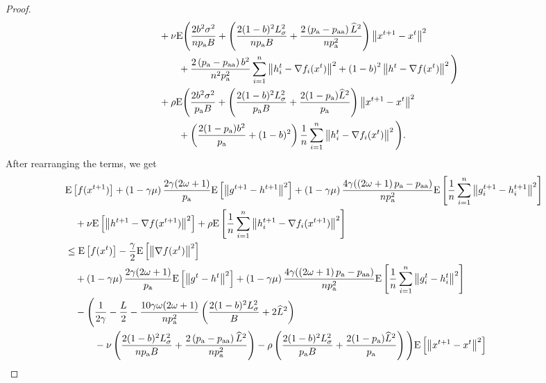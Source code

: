 \documentclass{article}
\newcommand*{\probavailable}{\ensuremath{p_{\textnormal{a}}}}
\newcommand*{\probpairaa}{\ensuremath{p_{\textnormal{aa}}}}
\begin{document}
\begin{proof}
\begin{align*}
        &\quad  + \nu {\rm E}\Bigg(\frac{2 b^2 \sigma^2}{n \probavailable B} + \left(\frac{2 (1 - b)^2 L_{\sigma}^2}{n \probavailable B} + \frac{2\left(\probavailable - \probpairaa\right) \widehat{L}^2}{n \probavailable^2} \right) \norm{x^{t+1} - x^{t}}^2\\
        &\qquad\quad + \frac{2 \left(\probavailable - \probpairaa\right) b^2}{n^2 \probavailable^2} \sum_{i=1}^n \norm{h^t_i - \nabla f_i(x^{t})}^2 + \left(1 - b\right)^2 \norm{h^{t} - \nabla f(x^{t})}^2\Bigg) \\
        &\quad + \rho {\rm E}\Bigg(\frac{2 b^2 \sigma^2}{\probavailable B}  + \left(\frac{2 (1 - b)^2 L_{\sigma}^2}{\probavailable B} + \frac{2(1 - \probavailable) \widehat{L}^2}{\probavailable}\right)\norm{x^{t+1} - x^{t}}^2 \\
        &\qquad\quad + \left(\frac{2 (1 - \probavailable) b^2}{\probavailable} + (1 - b)^2\right) \frac{1}{n} \sum_{i=1}^n \norm{h^t_i - \nabla f_i(x^{t})}^2\Bigg).
      \end{align*}
      After rearranging the terms, we get
      \begin{align*}
        &\Exp{f(x^{t + 1})} + \left(1 - \gamma \mu\right)\frac{2\gamma (2 \omega + 1)}{\probavailable} \Exp{\norm{g^{t+1} - h^{t+1}}^2} + \left(1 - \gamma \mu\right)\frac{4\gamma (\left(2 \omega + 1\right)\probavailable - \probpairaa)}{n \probavailable^2} \Exp{\frac{1}{n}\sum_{i=1}^n\norm{g^{t+1}_i - h^{t+1}_i}^2}\\
        &\quad  + \nu \Exp{\norm{h^{t+1} - \nabla f(x^{t+1})}^2} + \rho \Exp{\frac{1}{n}\sum_{i=1}^n\norm{h^{t+1}_i - \nabla f_i(x^{t+1})}^2}\\
        &\leq \Exp{f(x^t)} - \frac{\gamma}{2}\Exp{\norm{\nabla f(x^t)}^2} \\
        &\quad + \left(1 - \gamma \mu\right)\frac{2\gamma (2 \omega + 1)}{\probavailable} \Exp{\norm{g^{t} - h^{t}}^2} + \left(1 - \gamma \mu\right)\frac{4\gamma (\left(2 \omega + 1\right)\probavailable - \probpairaa)}{n \probavailable^2} \Exp{\frac{1}{n}\sum_{i=1}^n\norm{g^{t}_i - h^{t}_i}^2} \\
        &\quad - \Bigg(\frac{1}{2\gamma} - \frac{L}{2} - \frac{10 \gamma \omega (2 \omega + 1)}{n \probavailable^2} \left(\frac{2 (1 - b)^2 L_{\sigma}^2}{B} + 2 \widehat{L}^2\right) \\
        &\qquad\quad - \nu\left(\frac{2 (1 - b)^2 L_{\sigma}^2}{n \probavailable B} + \frac{2\left(\probavailable - \probpairaa\right) \widehat{L}^2}{n \probavailable^2} \right) - \rho \left(\frac{2 (1 - b)^2 L_{\sigma}^2}{\probavailable B} + \frac{2(1 - \probavailable) \widehat{L}^2}{\probavailable}\right)\Bigg) \Exp{\norm{x^{t+1} - x^t}^2} \\

\end{align*}
\end{proof}
\end{document}
